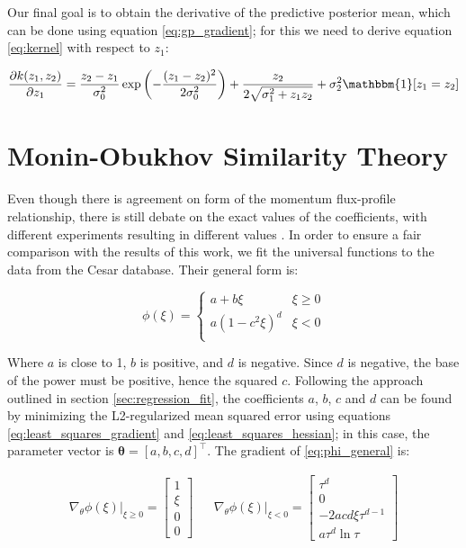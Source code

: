 \documentclass[a4paper]{book}
\begin{document}
Our final goal is to obtain the derivative of the predictive posterior mean, which can be done using equation \ref{eq:gp_gradient}; for this we need to derive equation \ref{eq:kernel} with respect to $z_1$:

\begin{equation}
\label{eq:kernel_derivative}
\frac{\partial k(z_1,z_2)}{\partial z_1}=\frac{z_2-z_1}{\sigma_0^2}\exp\left(-\frac{(z_1-z_2)^2}{2\sigma_0^2}\right)+\frac{z_2}{2\sqrt{\sigma_1^2+z_1z_2}}+\sigma_2^2\mathbbm{1}[z_1=z_2]
\end{equation}



\section{Monin-Obukhov Similarity Theory}
\label{sec:most_fit}

Even though there is agreement on form of the momentum flux-profile relationship, there is still debate on the exact values of the coefficients, with different experiments resulting in different values \citep{hogstrom88}. In order to ensure a fair comparison with the results of this work, we fit the universal functions to the data from the Cesar database. Their general form is:

\begin{equation}
\label{eq:phi_general}
\phi(\xi)=\begin{cases}
a+b\xi & \xi\geq 0 \\
a(1-c^2\xi)^d & \xi<0 \\
\end{cases}
\end{equation}

Where $a$ is close to 1, $b$ is positive, and $d$ is negative. Since $d$ is negative, the base of the power must be positive, hence the squared $c$. Following the approach outlined in section \ref{sec:regression_fit}, the coefficients $a$, $b$, $c$ and $d$ can be found by minimizing the L2-regularized mean squared error using equations \ref{eq:least_squares_gradient} and \ref{eq:least_squares_hessian}; in this case, the parameter vector is $\bm\theta=\left[a,b,c,d\right]^\intercal$. The gradient of \ref{eq:phi_general} is:


\begin{align}
\nabla_\theta\phi(\xi)\vert_{\xi\geq 0}=\begin{bmatrix}
1 \\ \xi \\ 0 \\ 0
\end{bmatrix} &&
\nabla_\theta\phi(\xi)\vert_{\xi<0}=\begin{bmatrix}
\tau^d \\ 0 \\ -2acd\xi\tau^{d-1} \\ a\tau^d\ln\tau
\end{bmatrix}
\end{align}
\end{document}
